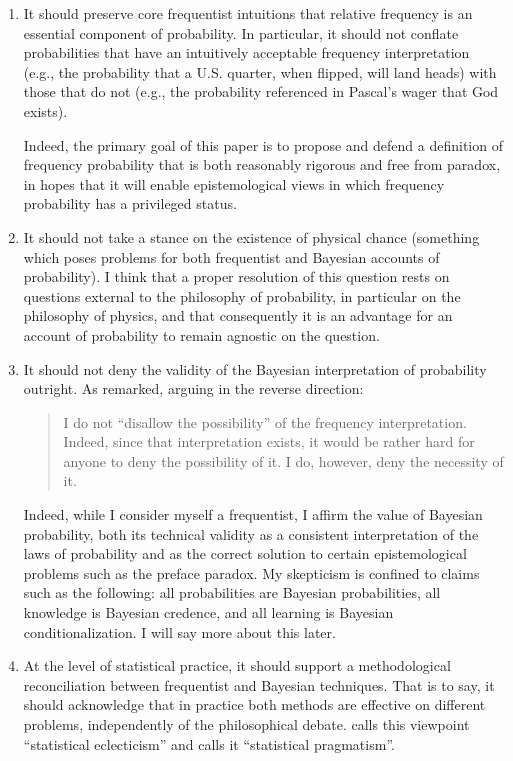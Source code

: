 \documentclass[letterpaper,12pt]{article}
\begin{document}
\begin{enumerate}
\item
It should preserve core frequentist intuitions that relative frequency is an essential component of probability. In particular, it should not conflate probabilities that have an intuitively acceptable frequency interpretation (e.g., the probability that a U.S. quarter, when flipped, will land heads) with those that do not (e.g., the probability referenced in Pascal's wager that God exists).

Indeed, the primary goal of this paper is to propose and defend a definition of frequency probability that is both reasonably rigorous and free from paradox, in hopes that it will enable epistemological views in which frequency probability has a privileged status.

\item
It should not take a stance on the existence of physical chance (something which poses problems for both frequentist and Bayesian accounts of probability). I think that a proper resolution of this question rests on questions external to the philosophy of probability, in particular on the philosophy of physics, and that consequently it is an advantage for an account of probability to remain agnostic on the question.

\item
It should not deny the validity of the Bayesian interpretation of probability outright. As \cite{Jaynes1985-JAYSRO} remarked, arguing in the reverse direction:

\begin{quotation}
I do not ``disallow the possibility'' of the frequency interpretation. Indeed, since that interpretation exists, it would be rather hard for anyone to deny the possibility of it. I do, however, deny the necessity of it.
\end{quotation}

Indeed, while I consider myself a frequentist, I affirm the value of Bayesian probability, both its technical validity as a consistent interpretation of the laws of probability and as the correct solution to certain epistemological problems such as the preface paradox. My skepticism is confined to claims such as the following: all probabilities are Bayesian probabilities, all knowledge is Bayesian credence, and all learning is Bayesian conditionalization. I will say more about this later.

\item
At the level of statistical practice, it should support a methodological reconciliation between frequentist and Bayesian techniques. That is to say, it should acknowledge that in practice both methods are effective on different problems, independently of the philosophical debate. \cite{kass2011statistical} calls this viewpoint ``statistical eclecticism'' and \cite{senn2011you} calls it ``statistical pragmatism''.


\end{enumerate}
\end{document}

